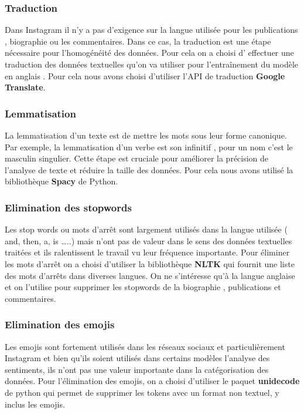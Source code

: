 \documentclass[12pt]{extarticle}
\begin{document}
\subsubsection{Traduction}
Dans Instagram il n'y a pas d’exigence sur la langue utilisée pour les publications , biographie ou les commentaires. Dans ce cas, la traduction est une étape nécessaire pour l’homogénéité des données. Pour cela on a choisi d' effectuer une traduction des données textuelles qu’on va utiliser pour l'entraînement du modèle en anglais .
Pour cela nous avons choisi d’utiliser l’API de traduction \textbf{Google Translate}.
\subsubsection{Lemmatisation}
La lemmatisation d’un texte est de mettre les mots sous leur forme canonique. Par exemple, la lemmatisation d’un verbe est son infinitif , pour un nom c’est le masculin singulier. Cette étape est cruciale pour améliorer la précision de l’analyse de texte et réduire la taille des données.
Pour cela nous avons utilisé la bibliothèque \textbf{Spacy} de Python.
\subsubsection{Elimination des stopwords}
Les stop words ou mots d'arrêt sont largement utilisés dans la langue utilisée ( and, then, a, is …..) mais n’ont pas de valeur dans le sens des données textuelles traitées et ils ralentissent le travail vu leur fréquence importante.
Pour éliminer les mots d'arrêt on a choisi d’utiliser la bibliothèque \textbf{NLTK} qui fournit une liste des mots d'arrêts dans diverses langues. On ne s'intéresse qu'à la langue anglaise et on l’utilise pour supprimer les stopwords de la biographie , publications et commentaires.
\subsubsection{Elimination des emojis}
Les emojis sont fortement utilisés dans les réseaux sociaux et particulièrement Instagram et bien qu'ils soient utilisés dans certains modèles l’analyse des sentiments, ils n'ont pas une valeur importante dans la catégorisation des données.
Pour l'élimination des emojis, on a choisi d’utiliser le paquet\textbf{ unidecode} de python qui permet de supprimer les tokens avec un format non textuel, y inclus les emojis.
\end{document}
